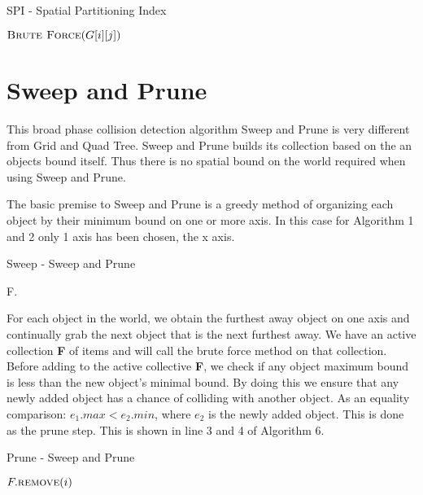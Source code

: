 \documentclass[conference]{IEEEtran}
\begin{document}
\begin{algorithm}
\caption{SPI - Spatial Partitioning Index}
\begin{algorithmic}[1]
			\State $\Call{Brute Force}{G[i][j]}$
		\EndFor
	\EndFor
\EndFunction
\end{algorithmic}
\end{algorithm}

\section{Sweep and Prune}

This broad phase collision detection algorithm Sweep and Prune is very different from Grid and Quad Tree. Sweep and Prune builds its collection based on the an objects bound itself. Thus there is no spatial bound on the world required when using Sweep and Prune.

The basic premise to Sweep and Prune is a greedy method of organizing each object by their minimum bound on one or more axis. In this case for Algorithm 1 and 2 only 1 axis has been chosen, the x axis.

\begin{algorithm}
\caption{Sweep - Sweep and Prune}
\begin{algorithmic}[1]
		\State {}
		\State F.
		\State {}
	\EndFor
\EndFunction
\end{algorithmic}
\end{algorithm}

For each object in the world, we obtain the furthest away object on one axis and continually grab the next object that is the next furthest away. We have an active collection \textbf{F} of items and will call the brute force method on that collection. Before adding to the active collective \textbf{F}, we check if any object maximum bound is less than the new object's minimal bound. By doing this we ensure that any newly added object has a chance of colliding with another object. As an equality comparison: $e_{1}.max < e_{2}.min$, where $e_{2}$ is the newly added object. This is done as the prune step. This is shown in line 3 and 4 of Algorithm 6.

\begin{algorithm}
\caption{Prune - Sweep and Prune}
\begin{algorithmic}[1]
			\State $F.\Call{remove}{i}$
		\EndIf
	\EndFor
\EndFunction
\end{algorithmic}
\end{algorithm}
\end{document}
